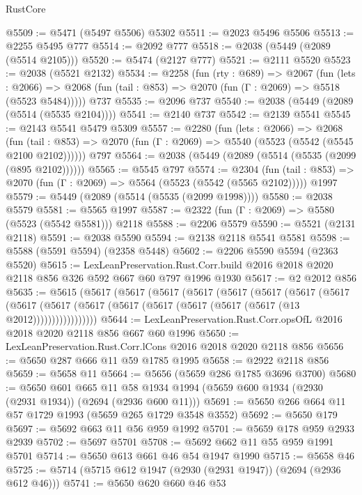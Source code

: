 \begin{lexlean}{RustCore}
\begin{coremodule}
@5509 := @5471 (@5497 @5506) @5302
@5511 := @2023 @5496 @5506
@5513 := @2255 @5495 @777
@5514 := @2092 @777
@5518 := @2038 (@5449 (@2089 (@5514 @2105)))
@5520 := @5474 (@2127 @777)
@5521 := @2111 @5520
@5523 := @2038 (@5521 @2132)
@5534 := @2258
    (fun (rty : @689) =>
    @2067
      (fun (lets : @2066) =>
      @2068 (fun (tail : @853) => @2070 (fun (Γ : @2069) => @5518 (@5523 @5484)))))
    @737
@5535 := @2096 @737
@5540 := @2038 (@5449 (@2089 (@5514 (@5535 @2104))))
@5541 := @2140 @737
@5542 := @2139 @5541
@5545 := @2143 @5541 @5479 @5309
@5557 := @2280
    (fun (lets : @2066) =>
    @2068
      (fun (tail : @853) => @2070 (fun (Γ : @2069) => @5540 (@5523 (@5542 (@5545 @2100 @2102))))))
    @797
@5564 := @2038 (@5449 (@2089 (@5514 (@5535 (@2099 (@895 @2102))))))
@5565 := @5545 @797
@5574 := @2304
    (fun (tail : @853) => @2070 (fun (Γ : @2069) => @5564 (@5523 (@5542 (@5565 @2102)))))
    @1997
@5579 := @5449 (@2089 (@5514 (@5535 (@2099 @1998))))
@5580 := @2038 @5579
@5581 := @5565 @1997
@5587 := @2322 (fun (Γ : @2069) => @5580 (@5523 (@5542 @5581))) @2118
@5588 := @2206 @5579
@5590 := @5521 (@2131 @2118)
@5591 := @2038 @5590
@5594 := @2138 @2118 @5541 @5581
@5598 := @5588 (@5591 @5594) (@2358 @5448)
@5602 := @2206 @5590 @5594 (@2363 @5520)
@5615 := LexLeanPreservation.Rust.Corr.build
    @2016
    @2018
    @2020
    @2118
    @856
    @326
    @592
    @667
    @60
    @797
    @1996
    @1930
@5617 := @2 @2012 @856
@5635 := @5615
    (@5617
      (@5617
        (@5617
          (@5617
            (@5617
              (@5617
                (@5617
                  (@5617
                    (@5617
                      (@5617 (@5617 (@5617 (@5617 (@5617 (@5617 (@5617 (@13 @2012)))))))))))))))))
@5644 := LexLeanPreservation.Rust.Corr.opsOfL @2016 @2018 @2020 @2118 @856 @667 @60 @1996
@5650 := LexLeanPreservation.Rust.Corr.lCons @2016 @2018 @2020 @2118 @856
@5656 := @5650 @287 @666 @11 @59 @1785 @1995
@5658 := @2922 @2118 @856
@5659 := @5658 @11
@5664 := @5656 (@5659 @286 @1785 @3696 @3700)
@5680 := @5650
    @601
    @665
    @11
    @58
    @1934
    @1994
    (@5659 @600 @1934 (@2930 (@2931 @1934)) (@2694 (@2936 @600 @11)))
@5691 := @5650 @266 @664 @11 @57 @1729 @1993 (@5659 @265 @1729 @3548 @3552)
@5692 := @5650 @179
@5697 := @5692 @663 @11 @56 @959 @1992
@5701 := @5659 @178 @959 @2933 @2939
@5702 := @5697 @5701
@5708 := @5692 @662 @11 @55 @959 @1991 @5701
@5714 := @5650 @613 @661 @46 @54 @1947 @1990
@5715 := @5658 @46
@5725 := @5714 (@5715 @612 @1947 (@2930 (@2931 @1947)) (@2694 (@2936 @612 @46)))
@5741 := @5650
    @620
    @660
    @46
    @53

\end{coremodule}
\end{lexlean}
